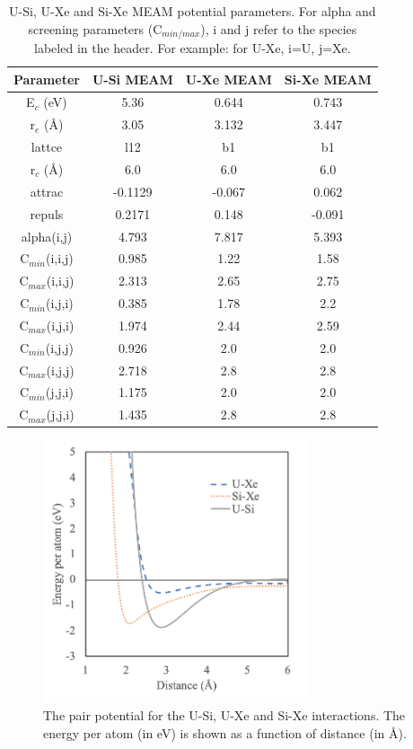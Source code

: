\documentclass[review]{elsarticle}
\providecommand{\DIFaddtex}[1]{{\protect\color{blue} \sf #1}} %
\providecommand{\DIFaddbegin}{} %
\providecommand{\DIFaddFL}[1]{\DIFadd{#1}} %
\providecommand{\DIFadd}[1]{\texorpdfstring{\DIFaddtex{#1}}{#1}} %
\newcommand{\DIFaddincludegraphics}[2][]{{\color{blue}\fbox{\DIFOincludegraphics[#1]{#2}}}} %
\DeclareRobustCommand{\DIFaddbegin}{\DIFOaddbegin \let\includegraphics\DIFaddincludegraphics} %
\begin{document}
\begin{table}[h]
\caption{U-Si, U-Xe and Si-Xe MEAM potential parameters. For alpha and screening parameters (C$_{min/max}$), i and j refer to the species labeled in the header. For example: for U-Xe, i=U, j=Xe. }\label{tab:meam}
\begin{center}
\begin{tabular}{|c|c|c|c|}
 \hline
 Parameter & U-Si MEAM \cite{beelerusi} & U-Xe MEAM & Si-Xe MEAM \\
 \hline
 E$_{c}$ (eV) & 5.36 & 0.644 & 0.743 \\ 
 r$_{e}$ (\AA) & 3.05 & 3.132 & 3.447 \\
 lattce & l12 & b1 & b1\\
 r$_{c}$ (\AA) & 6.0 & 6.0 & 6.0\\
 attrac & -0.1129 & -0.067 & 0.062 \\
 repuls & 0.2171 & 0.148 & -0.091 \\
 alpha(i,j) & 4.793 & 7.817 & 5.393 \\
 C$_{min}$(i,i,j) & 0.985 &1.22 & 1.58\\
 C$_{max}$(i,i,j) & 2.313 & 2.65 & 2.75\\
 C$_{min}$(i,j,i) & 0.385 & 1.78 & 2.2 \\
 C$_{max}$(i,j,i) & 1.974 & 2.44 & 2.59\\
 C$_{min}$(i,j,j) & 0.926 & 2.0 & 2.0\\
 C$_{max}$(i,j,j) & 2.718 & 2.8 & 2.8\\
 C$_{min}$(j,j,i) & 1.175 & 2.0 & 2.0\\ 
 C$_{max}$(j,j,i) & 1.435 & 2.8 & 2.8 \\
 \hline
\end{tabular}
\end{center}
\label{default}
\end{table}%

\DIFaddbegin \begin{figure}[hbt]
	\centering
	\includegraphics[width=0.7\textwidth]{dimer_E.png}
 \caption{ \DIFaddFL{The pair potential for the U-Si, U-Xe and Si-Xe interactions. The energy per atom (in eV) is shown as a function of distance (in \AA). }}\label{fig:dimer}
\end{figure}
\end{document}
